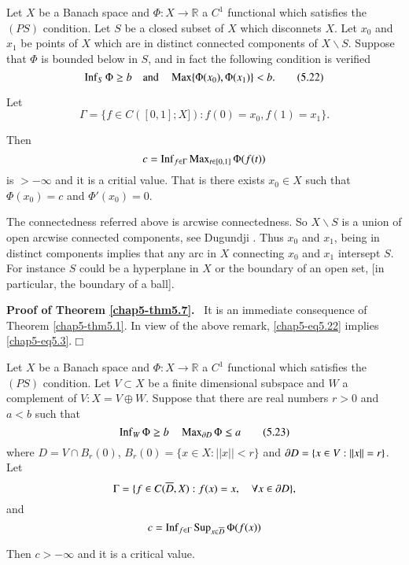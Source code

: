 \begin{theorem}\label{chap5-thm5.7}
Let $X$ be a Banach space and $\Phi:X\to \mathbb{R}$ a $C^{1}$
functional which satisfies the $(PS)$ condition. Let $S$ be a closed
subset of $X$ which disconnets $X$. Let $x_{0}$ and $x_{1}$ be points
of $X$ which are in distinct connected components of $X\backslash
S$. Suppose that $\Phi$ is bounded below in $S$, and in fact the
following condition is verified
\begin{equation*}
\operatorname{Inf}_{S}\Phi\geq b\quad\text{and}\quad
\operatorname{Max}\{\Phi(x_{0}),\Phi(x_{1})\}<b.\tag{5.22}\label{chap5-eq5.22} 
\end{equation*}

Let\pageoriginale
$$
\Gamma=\{f\in C([0,1];X]):f(0)=x_{0},f(1)=x_{1}\}.
$$

Then
$$
c=\operatorname{Inf}_{f\in\Gamma}\operatorname{Max}_{t\in[0,1]}\Phi(f(t))
$$
is $>-\infty$ and it is a critial value. That is there exists
$x_{0}\in X$ such that $\Phi(x_{0})=c$ and $\Phi'(x_{0})=0$.
\end{theorem}

\begin{remark*}
The connectedness referred above is arcwise connectedness. So
$X\backslash S$ is a union of open arcwise connected components, see
Dugundji \cite[p. 116]{key34}. Thus $x_{0}$ and $x_{1}$, being in
distinct components implies that any arc in $X$ connecting $x_{0}$ and
$x_{1}$ intersept $S$. For instance $S$ could be a hyperplane in $X$
or the boundary of an open set, [in particular, the boundary of a
  ball].
\end{remark*}

\noindent
{\bf Proof of Theorem \ref{chap5-thm5.7}.}~ It is an immediate
consequence of Theorem \ref{chap5-thm5.1}. In view of the above
remark, \eqref{chap5-eq5.22} implies \eqref{chap5-eq5.3}.\hfill$\Box$

\begin{theorem}\label{chap5-thm5.8}
Let $X$ be a Banach space and $\Phi:X\to \mathbb{R}$ a $C^{1}$
functional which satisfies the $(PS)$ condition. Let $V\subset X$ be a
finite dimensional subspace and $W$ a complement of $V:X=V\oplus
W$. Suppose that there are real numbers $r>0$ and $a<b$ such that
\begin{equation*}
\operatorname{Inf}_{W}\Phi\geq b\quad \operatorname{Max}_{\partial D}\Phi\leq
a\tag{5.23}\label{chap5-eq5.23} 
\end{equation*}
where $D=V\cap B_{r}(0)$, $B_{r}(0)=\{x\in X:||x||<r\}$ and $\partial
D=\{x\in V:||x||=r\}$. Let
$$
\Gamma=\{f\in C(\overline{D},X):f(x)=x,\quad \forall x\in \partial D\},
$$
and
$$
c=\operatorname{Inf}_{f\in \Gamma}\operatorname{Sup}_{x\in\overline{D}}\Phi(f(x))
$$

Then $c>-\infty$ and it is a critical value.
\end{theorem}

